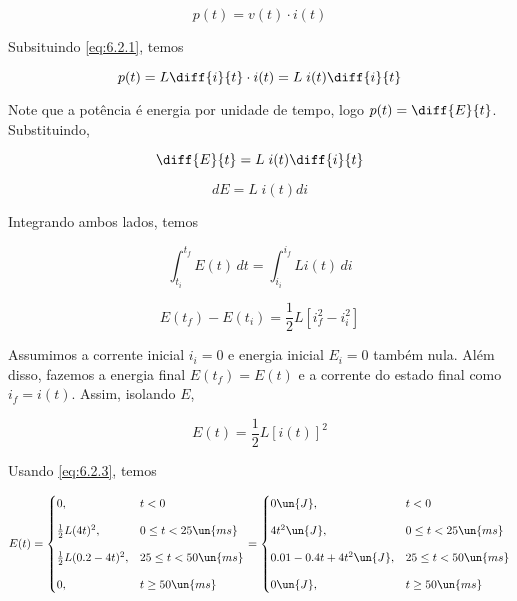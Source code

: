 \[ p(t) = v(t) \cdot i(t)  \]

Subsituindo \eqref{eq:6.2.1}, temos

\[ p(t) = L\diff{i}{t} \cdot i(t) = L\;i(t)\diff{i}{t}  \]

Note que a potência é energia por unidade de tempo, logo $p(t) = \diff{E}{t}$. Substituindo,

\[ \diff{E}{t} = L\;i(t)\diff{i}{t}  \]

\[ dE = L\;i(t)di  \]

Integrando ambos lados, temos

\[ \int_{t_i}^{t_f} E(t) \,dt = \int_{i_i}^{i_f} Li(t) \,di  \]

\[ E(t_f) - E(t_i) = \frac{1}{2}L\left[i_f^2 - i_i^2\right]  \]

Assumimos a corrente inicial $i_i =0$ e energia inicial $E_i = 0$ também nula. Além disso, fazemos
a energia final $E(t_f) = E(t)$ e a corrente do estado final como $i_f = i(t)$. Assim, isolando $E$,

\begin{equation}\label{eq:6.2.3}
    E(t) = \frac{1}{2}L\left[i(t)\right]^2
\end{equation}

Usando \eqref{eq:6.2.3}, temos 

\[ E(t) =
    \begin{cases}
        0,   & t < 0                 \\
        \noalign{\vskip9pt}
        \frac{1}{2}L(4t)^2,  & 0 \leq t < 25 \un{ms} \\
        \noalign{\vskip9pt}
        \frac{1}{2}L(0.2 - 4t)^2, & 25 \leq t < 50 \un{ms} \\
        \noalign{\vskip9pt}
        0,   & t \geq 50 \un{ms}
    \end{cases}
    =
    \begin{cases}
        0 \un{J},   & t < 0                 \\
        \noalign{\vskip9pt}
        4t^2 \un{J},  & 0 \leq t < 25 \un{ms} \\
        \noalign{\vskip9pt}
        0.01 - 0.4t + 4t^2 \un{J}, & 25 \leq t < 50 \un{ms} \\
        \noalign{\vskip9pt}
        0 \un{J},   & t \geq 50 \un{ms}
    \end{cases}
\]





